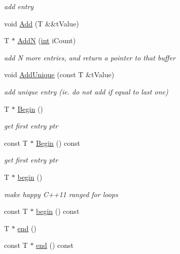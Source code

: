 \begin{DoxyCompactItemize}
\begin{DoxyCompactList}\small\item\em add entry \end{DoxyCompactList}\item 
void \hyperlink{classCSphVector_a8d9a46a58251daa5a2e1a714e660bde5}{Add} (T \&\&t\-Value)
\item 
T $\ast$ \hyperlink{classCSphVector_a3d9e649437927eb2a93b6fb6c17e7b69}{Add\-N} (\hyperlink{sphinxexpr_8cpp_a4a26e8f9cb8b736e0c4cbf4d16de985e}{int} i\-Count)
\begin{DoxyCompactList}\small\item\em add N more entries, and return a pointer to that buffer \end{DoxyCompactList}\item 
void \hyperlink{classCSphVector_a7d579b96a81740df69561d839e3b69ff}{Add\-Unique} (const T \&t\-Value)
\begin{DoxyCompactList}\small\item\em add unique entry (ie. do not add if equal to last one) \end{DoxyCompactList}\item 
T $\ast$ \hyperlink{classCSphVector_a69727c103715702138ba9141e4e593dc}{Begin} ()
\begin{DoxyCompactList}\small\item\em get first entry ptr \end{DoxyCompactList}\item 
const T $\ast$ \hyperlink{classCSphVector_a7a27d79606ce4dbb6ba944042cec1424}{Begin} () const 
\begin{DoxyCompactList}\small\item\em get first entry ptr \end{DoxyCompactList}\item 
T $\ast$ \hyperlink{classCSphVector_ab9475f50784ad046ec3faa06d506f329}{begin} ()
\begin{DoxyCompactList}\small\item\em make happy C++11 ranged for loops \end{DoxyCompactList}\item 
const T $\ast$ \hyperlink{classCSphVector_ac89d3106e9e278c6c1a3bb008b614896}{begin} () const 
\item 
T $\ast$ \hyperlink{classCSphVector_acfab9c58d14273e32ec5d6d230d1a1bd}{end} ()
\item 
const T $\ast$ \hyperlink{classCSphVector_a8e54266f61fc1ee2d6a76c3e2983c753}{end} () const 
\item 

\end{DoxyCompactItemize}
